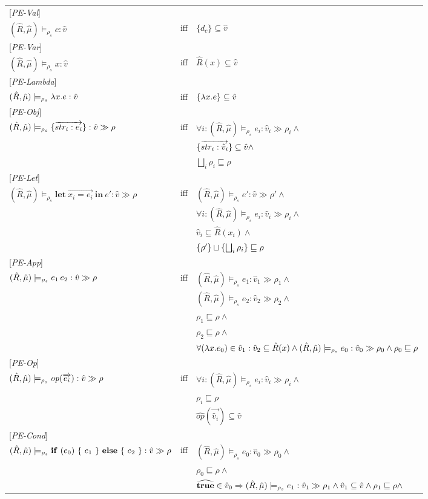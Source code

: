 \documentclass[[12pt,a4paper,twoside,openrigh]{article}
\newcommand{\vat}[0]{\hat{v}}
\newcommand{\muat}[0]{\hat{\mu}}
\newcommand{\Rat}[0]{\hat{R}}
\newcommand{\modelrho}{\models_{\rho_s}}
\newcommand{\aenvs}{(\Rat,\muat)}
\newcommand{\caesti}[2]{\aenvs \modelrho #1 : \vat_{#2} \gg \rho_{#2}}
\newcommand{\caest}[1]{\aenvs \modelrho #1 : \vat \gg \rho}
\newcommand{\letexprs}[3]{\mathbf{let}\ \vec{#1 = #2}\ \mathbf{in}\ #3}
\begin{document}
\begin{tabular}{l l l}
{[\textit{PE-Val}]} \\
$\aenvs \modelrho c : \vat$ & iff & $\{d_c\} \subseteq \vat$ \\ 
{[\textit{PE-Var}]} \\
$\aenvs \modelrho x : \vat$ & iff & $\Rat(x) \subseteq \vat$ \\ 
{[\textit{PE-Lambda}]} \\
$\aenvs \modelrho \lam{x}{e} : \vat$ & iff & $\{\lam{x}{e}\} \subseteq \vat$ \\
{[\textit{PE-Obj}]} \\
$\caest {\rec{\vec{str_i : e_i}}}$ & iff & $\forall i: \caesti {e_i} {i} \wedge$\\
&& $\rec{\vec{str_i :\vat_i}} \subseteq \vat \wedge$ \\
&& $\bigsqcup_{i} \rho_i \sqsubseteq \rho$ \\ 
{[\textit{PE-Let}]} \\
$\caest {\letexprs{x_i}{e_i}{e'}}$ & iff & $\aenvs \modelrho e' : \vat \gg \rho' \wedge$ \\
&& $ \forall i: \caesti {e_i} {i} \wedge$ \\
&& $\vat_i \subseteq \Rat(x_i) \wedge$ \\
&& $ \{\rho'\} \sqcup \{\bigsqcup_i \rho_i\} \sqsubseteq \rho$ \\
{[\textit{PE-App}]} \\
$\caest {\appl {e_1} {e_2}}$ & iff & $ \caesti {e_1} {1} \wedge$ \\
&& $\caesti {e_2} {2} \wedge$ \\
&& $\rho_1 \sqsubseteq \rho \wedge$ \\
&& $\rho_2 \sqsubseteq \rho \wedge$ \\
&& $\forall (\lam{x}{e_0}) \in \vat_1 : \vat_2 \subseteq \Rat(x) \wedge \caesti {e_0} {0} \wedge \rho_0 \sqsubseteq \rho $\\
{[\textit{PE-Op}]} \\
$\caest {\op (\vec{e_i})} $& iff &$\forall i : \caesti {e_i} {i} \wedge $\\
&& $\rho_i \sqsubseteq \rho$\\
&& $\widehat{op} (\vec{\vat_i}) \subseteq \vat $\\
{[\textit{PE-Cond}]}\\
$\caest {\cond {e_0} {e_1} {e_2}} $& iff &$ \caesti {e_0} {0} \wedge $\\
&& $\rho_0 \sqsubseteq \rho \wedge$ \\
&& $\widehat{\true} \in \vat_0 \Rightarrow \caesti {e_1} {1} \wedge \vat_1 \subseteq \vat \wedge \rho_1 \sqsubseteq \rho \wedge$ \\

\end{tabular}
\end{document}
